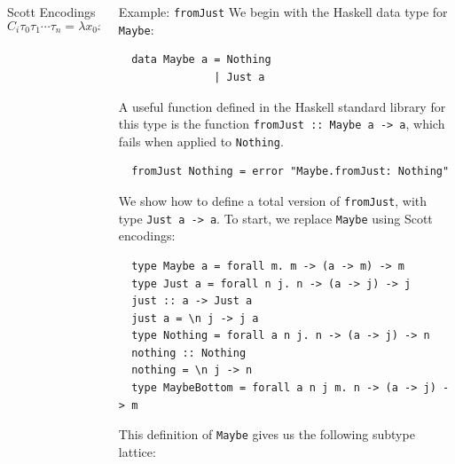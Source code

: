 \documentclass[final]{beamer}
\begin{document}
\begin{frame}[fragile]
\begin{columns}[t]
\begin{column}{.285\textwidth}
\begin{block}{Scott Encodings}
$$C_i \tau_0 \tau_1 \cdots \tau_n = \lambda x_0 x_1 \cdots x_n c_0 c_1 \cdots c_m . c_i x_0 x_1 \cdots x_n$$
\end{block}
\end{column}

\begin{column}{.33\textwidth}
\begin{block}{Example: \texttt{fromJust}}
\vspace{0.5cm}
We begin with the Haskell data type for \texttt{Maybe}:

\begin{verbatim}
  data Maybe a = Nothing
               | Just a
\end{verbatim}

A useful function defined in the Haskell standard library for this type is the
function \verb!fromJust :: Maybe a -> a!, which fails when applied to
\texttt{Nothing}.

\begin{verbatim}
  fromJust Nothing = error "Maybe.fromJust: Nothing"
\end{verbatim}

We show how to define a total version of \texttt{fromJust}, with type
\texttt{Just a -> a}. To start, we replace \texttt{Maybe} using Scott
encodings:

\begin{verbatim}
  type Maybe a = forall m. m -> (a -> m) -> m 
  type Just a = forall n j. n -> (a -> j) -> j
  just :: a -> Just a
  just a = \n j -> j a
  type Nothing = forall a n j. n -> (a -> j) -> n
  nothing :: Nothing
  nothing = \n j -> n
  type MaybeBottom = forall a n j m. n -> (a -> j) -> m
\end{verbatim}

This definition of \texttt{Maybe} gives us the following subtype lattice:

\begin{figure}[!h]
\centering
{}
\end{figure}
\end{block}
\end{column}
\end{columns}
\end{frame}
\end{document}
